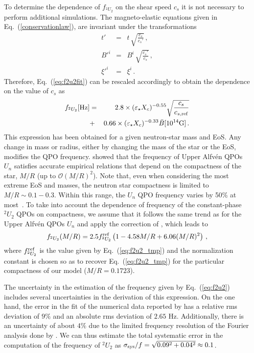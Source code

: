 \documentclass[useAMS,usenatbib]{mnras}
\begin{document}
To determine the dependence of $f_{^2U_2}$ on the shear speed $c_s$ it is not necessary to perform additional simulations. The magneto-elastic equations given in Eq.~(\ref{conservationlaw}), are invariant under the transformations
%
\begin{eqnarray}
t' &=&  t \, \sqrt{\frac{c_s}{c_s'}} \,,\label{eq:rescale1} \\
B'^i & = & B^i \,\sqrt{\frac{c_s'}{c_s}} \,, \label{eq:rescale2}\\
\xi'^i & = &\xi^i \,. \label{eq:rescale3}
\end{eqnarray}
%
Therefore, Eq.~(\ref{eq:f2u2fit}) can be rescaled accordingly to obtain the 
dependence on the value of $c_s$ as
%
\begin{eqnarray}
 f_{^2U_2}[\mathrm{Hz}] &=& 2.8\times(\varepsilon_\star X_c)^{-0.55}  
\sqrt{\frac{c_s}{c_{s, {\rm ref}}}} \nonumber\\ 
&+& 0.66 \times(\varepsilon_\star X_c)^{-0.33}\bar B 
[10^{14}\mathrm{G}]\,. \label{eq:f2u2_tmp}
\end{eqnarray}
This expression has been obtained for a given neutron-star mass and EoS. Any 
change in mass or radius, either by changing the mass of the star or the EoS, 
modifies the QPO frequency. \cite{Sotani2008} showed that the frequency of 
Upper Alfv\'en QPOs $U_n$ satisfies accurate empirical relations that depend on 
the compactness of the star, $M/R$ (up to ${\mathcal O}(M/R)^2$). Note
that, even when considering the most extreme EoS and masses, the neutron star 
compactness is limited  to $M/R \sim 0.1-0.3$. Within this range, the $U_n$ 
QPO frequency varies by 50$\%$ at most~\citep{Sotani2008}. To take into 
account the dependence of frequency of the constant-phase $^2U_2$ QPOs on 
compactness, we assume that it follows the same trend as for the Upper Alfv\'en 
QPOs $U_n$ and apply the correction of \cite{Sotani2008}, which leads to
%
\begin{eqnarray}
  f_{^2U_2}(M/R)  =  2.5 f^{\rm ref}_{^2U_2}
  \left( 1 - 4.58 M/R + 6.06 (M/R)^2  \right)\,, \label{eq:f2u2}
\end{eqnarray}
%
where $f^{\rm ref}_{^2U_2}$ is the value given by Eq.~(\ref{eq:f2u2_tmp}) and 
the normalization constant is chosen so as to recover Eq.~(\ref{eq:f2u2_tmp}) 
for the particular compactness of our model ($M/R = 0.1723$).

The uncertainty in the estimation of the frequency given by Eq.~(\ref{eq:f2u2}) includes several uncertainties in the derivation of this expression. On the one hand, the error in the fit of the numerical data reported by \cite{Gabler2016} has a relative rms deviation of  $9\%$ and an absolute rms deviation of $2.65$ Hz. Additionally, there is an uncertainty of about $4\%$ due to the limited frequency resolution of the Fourier analysis done by \cite{Gabler2016}. We can thus estimate the total systematic 
error in the computation of the frequency of $^2U_2$ as $\sigma_{\rm sys}/f = 
\sqrt{0.09^2+0.04^2}\approx 0.1$.
\end{document}
